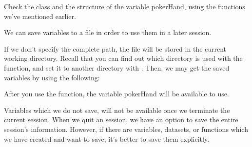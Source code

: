 Check the class and the structure of the variable pokerHand, using the functions we've mentioned earlier.

We can save variables to a file in order to use them in a later session.
\begin{knitrout}
\color{fgcolor}\begin{kframe}
\begin{alltt}
 \hlstd{=}\hlstd{)}
\end{alltt}
\end{kframe}
\end{knitrout}
If we don't specify the complete path, the file will be stored in the current working directory. Recall that you can find out which directory is used with the  function, and set it to another directory with .
Then, we may get the saved variables by using the following:
\begin{knitrout}
\color{fgcolor}\begin{kframe}
\begin{alltt}
\hlstd{(}\hlstd{)}
\end{alltt}
\end{kframe}
\end{knitrout}
After you use the  function, the variable pokerHand will be available to use.

Variables which we do not save, will not be available once we terminate the current \R session. When we quit an \R session, we have an option to save the entire session's information. However, if there are variables, datasets, or functions which we have created and want to save, it's better to save them explicitly.

